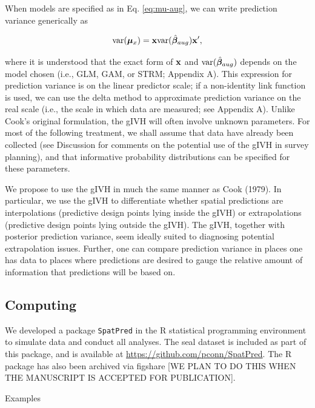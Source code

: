 \documentclass[12pt,english]{article}
\begin{document}
\begin{spacing}{1.9}
When models are specified as in Eq. \ref{eq:mu-aug}, we can write prediction variance generically as
\begin{linenomath*}
\begin{equation}
  \label{eq:var-mu}
  {\rm var}(\boldsymbol{\mu}_x)= {\bf x} {\rm var}(\hat{\boldsymbol{\beta}}_{aug}) {\bf x}^\prime,
\end{equation}
\end{linenomath*}
where it is understood that the exact form of ${\bf x}$ and ${\rm var}(\hat{\boldsymbol{\beta}}_{aug})$ depends on the model chosen (i.e., GLM, GAM, or STRM; Appendix A). This expression for prediction variance is on the linear predictor scale; if a non-identity link function is used, we can use the delta method \citep{Dorfman1938,VerHoef2012b} to approximate prediction variance on the real scale (i.e., the scale in which data are measured; see Appendix A).  Unlike Cook's original formulation, the gIVH will often involve unknown parameters.  For most of the following treatment, we shall assume that data have already been collected (see Discussion for comments on the potential use of the gIVH in survey planning), and that informative probability distributions can be specified for these parameters.

We propose to use the gIVH in much the same manner as Cook (1979).  In particular, we use the gIVH to differentiate whether spatial predictions are interpolations (predictive design points lying inside the gIVH) or extrapolations (predictive design points lying outside the gIVH).  The gIVH, together with posterior prediction variance, seem ideally suited to diagnosing potential extrapolation issues. Further, one can compare prediction variance in places one has data to places where predictions are desired to gauge the relative amount of information that predictions will be based on.

\subsection{Computing}

We developed a package \texttt{SpatPred} in the R statistical programming environment \citep{RTeam2012} to simulate data and conduct all analyses.  The seal dataset is included as part of this package, and is available at \url{https://github.com/pconn/SpatPred}.  The R package has also been archived via figshare [WE PLAN TO DO THIS WHEN THE MANUSCRIPT IS ACCEPTED FOR PUBLICATION].


\centerline{\sc Examples}


\end{spacing}
\end{document}
